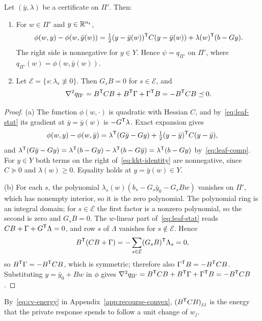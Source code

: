 \begin{lemma}\label{lem:leaf}
Let $(\bar y,\lambda)$ be a certificate on $\Pi'$. Then:
\begin{enumerate}
\item[(a)] For $w\in\Pi'$ and $y\in\mathbb R^{n_t}$,
\begin{equation}\label{eq:kkt-identity}
\phi(w,y)-\phi(w,\bar y(w))=\tfrac12(y-\bar y(w))^{\mathsf T}C(y-\bar y(w))
+\lambda(w)^{\mathsf T}(b-Gy).
\end{equation}
The right side is nonnegative for $y\in Y$. Hence $\psi=q_{\Pi'}$ on $\Pi'$,
where $q_{\Pi'}(w)=\phi(w,\bar y(w))$.
\item[(b)] Let $\mathcal E=\{s:\lambda_s\not\equiv0\}$. Then $G_sB=0$ for
$s\in\mathcal E$, and
\[
\nabla^2q_{\Pi'}=B^{\mathsf T}CB+B^{\mathsf T}\Gamma+\Gamma^{\mathsf T}B=-B^{\mathsf T}CB\preceq0.
\]
\end{enumerate}
\end{lemma}

\begin{proof}
(a) The function $\phi(w,\cdot)$ is quadratic with Hessian $C$, and
by~\eqref{eq:leaf-stat} its gradient at $\bar y=\bar y(w)$ is
$-G^{\mathsf T}\lambda$. Exact expansion gives
\[
\phi(w,y)-\phi(w,\bar y)=\lambda^{\mathsf T}(G\bar y-Gy)+\tfrac12(y-\bar y)^{\mathsf T}C(y-\bar y),
\]
and $\lambda^{\mathsf T}(G\bar y-Gy)=\lambda^{\mathsf T}(b-Gy)-\lambda^{\mathsf T}(b-G\bar y)
=\lambda^{\mathsf T}(b-Gy)$ by~\eqref{eq:leaf-comp}. For $y\in Y$ both terms on the
right of~\eqref{eq:kkt-identity} are nonnegative, since $C\succeq0$ and
$\lambda(w)\ge0$. Equality holds at $y=\bar y(w)\in Y$.

(b) For each $s$, the polynomial $\lambda_s(w)(b_s-G_s\bar y_0-G_sBw)$
vanishes on $\Pi'$, which has nonempty interior, so it is the zero
polynomial. The polynomial ring is an integral domain; for $s\in\mathcal E$
the first factor is a nonzero polynomial, so the second is zero and
$G_sB=0$. The $w$-linear part of~\eqref{eq:leaf-stat} reads
$CB+\Gamma+G^{\mathsf T}\Lambda=0$, and row $s$ of $\Lambda$ vanishes for
$s\notin\mathcal E$. Hence
\[
B^{\mathsf T}(CB+\Gamma)=-\sum_{s\in\mathcal E}(G_sB)^{\mathsf T}\Lambda_s=0,
\]
so $B^{\mathsf T}\Gamma=-B^{\mathsf T}CB$, which is symmetric; therefore also
$\Gamma^{\mathsf T}B=-B^{\mathsf T}CB$. Substituting $y=\bar y_0+Bw$ in $\phi$ gives
$\nabla^2q_{\Pi'}=B^{\mathsf T}CB+B^{\mathsf T}\Gamma+\Gamma^{\mathsf T}B=-B^{\mathsf T}CB$.
\end{proof}

By~\eqref{eq:cv-energy} in Appendix~\ref{app:recourse-convex},
$(B^{\mathsf T}CB)_{jj}$ is the energy that the private response spends to follow a
unit change of $w_j$.

